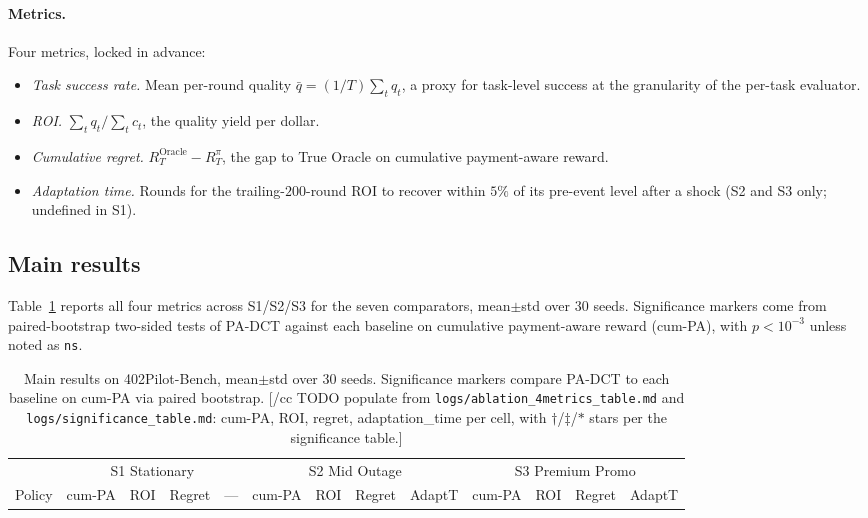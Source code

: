 \paragraph{Metrics.}
Four metrics, locked in advance:
\begin{itemize}
\item \emph{Task success rate.} Mean per-round quality $\bar q = (1/T)\sum_t q_t$, a proxy for task-level success at the granularity of the per-task evaluator.
\item \emph{ROI.} $\sum_t q_t / \sum_t c_t$, the quality yield per dollar.
\item \emph{Cumulative regret.} $R^{\mathrm{Oracle}}_T - R^{\pi}_T$, the gap to True Oracle on cumulative payment-aware reward.
\item \emph{Adaptation time.} Rounds for the trailing-$200$-round ROI to recover within $5\%$ of its pre-event level after a shock (S2 and S3 only; undefined in S1).
\end{itemize}

\subsection{Main results}
\label{sec:eval-main}

Table~\ref{tab:main} reports all four metrics across S1/S2/S3 for the seven comparators, mean$\pm$std over $30$ seeds. Significance markers come from paired-bootstrap two-sided tests of PA-DCT against each baseline on cumulative payment-aware reward (cum-PA), with $p<10^{-3}$ unless noted as \texttt{ns}.

\begin{table}[t]
\centering
\caption{Main results on 402Pilot-Bench, mean$\pm$std over $30$ seeds. Significance markers compare PA-DCT to each baseline on cum-PA via paired bootstrap. [/cc TODO populate from \texttt{logs/ablation\_4metrics\_table.md} and \texttt{logs/significance\_table.md}: cum-PA, ROI, regret, adaptation\_time per cell, with $\dagger$/$\ddagger$/$\ast$ stars per the significance table.]}
\label{tab:main}
\begin{tabular}{l|cccc|cccc|cccc}
\toprule
& \multicolumn{4}{c|}{S1 Stationary} & \multicolumn{4}{c|}{S2 Mid Outage} & \multicolumn{4}{c}{S3 Premium Promo} \\
Policy & cum-PA & ROI & Regret & --- & cum-PA & ROI & Regret & AdaptT & cum-PA & ROI & Regret & AdaptT \\
\midrule
\bottomrule
\end{tabular}
\end{table}

